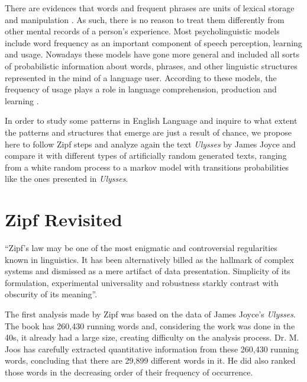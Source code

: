 There are evidences that words and frequent 
phrases are units of lexical storage and manipulation \citep{bybee2007frequency}. 
As such, there is no reason to treat them
differently from other mental records of a person's experience.
Most psycholinguistic models include word frequency as an important component of speech perception,
learning and usage. Nowadays these models have gone more general and included all sorts of probabilistic
information about words, phrases, and other linguistic structures represented in the mind of a language
user. According to these models, the frequency of usage plays a role in language comprehension, production
and learning \citep{jurafsky1996,MacDonald1993,Gregory99theeffects,Brent1996}.
 
In order to study some patterns in English Language and inquire to what extent the
patterns and structures that emerge are just a result of chance, we propose here
to follow Zipf steps and analyze again the text \textit{Ulysses} by James Joyce and
compare it with different types of artificially random generated texts, ranging from
a white random process to a markov model with transitions probabilities like the
ones presented in \textit{Ulysses}.
 
 
 
 
\section{Zipf Revisited}
\label{sec:zipf_revisited}
``Zipf's law may be one of the most enigmatic and controversial regularities known
in linguistics. It has been alternatively billed as the hallmark of complex systems and
dismissed as a mere artifact of data presentation. Simplicity of its formulation, experimental
universality and robustness starkly contrast with obscurity of its meaning''\citep{manin2008}.

The first analysis made by Zipf was based on the data of James Joyce's \textit{Ulysses}.
The book has 260,430 running words and, considering the work was done in the 40s, 
it already had a large size, creating difficulty on the analysis process.
Dr. M. Joos has carefully extracted quantitative information from these 260,430 running words,
concluding that there are 29,899 different words in it. He did also ranked those words in the
decreasing order of their frequency of occurrence. 

